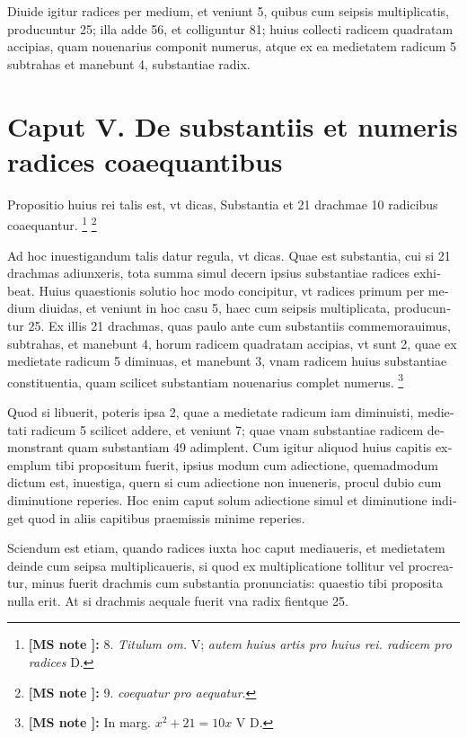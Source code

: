 \documentclass[11pt,a4paper]{book}
\newcounter{critnotectr}
\newcommand{\critnote}[1]{\stepcounter{critnotectr}\textsuperscript{\tiny\textcolor{criticalnote}{\thecritnotectr}}\footnote{\tiny\textcolor{criticalnote}{\textbf{[MS note \thecritnotectr]:} #1}}}
\begin{document}
\textlatin{Diuide igitur radices per medium, et veniunt 5, quibus cum seipsis multiplicatis, producuntur 25; illa adde 56, et colliguntur 81; huius collecti radicem quadratam accipias, quam nouenarius componit numerus, atque ex ea medietatem radicum 5 subtrahas et manebunt 4, substantiae radix.}

\vspace{0.5cm}

\section*{Caput V. De substantiis et numeris radices coaequantibus}

\textlatin{Propositio huius rei talis est, vt dicas, Substantia et 21 drachmae 10 radicibus coaequantur.}
\critnote{8. \textit{Titulum om.} V; \textit{autem huius artis pro huius rei. radicem pro radices} D.}
\critnote{9. \textit{coequatur pro aequatur}.}

\textlatin{Ad hoc inuestigandum talis datur regula, vt dicas. Quae est substantia, cui si 21 drachmas adiunxeris, tota summa simul decern ipsius substantiae radices exhibeat. Huius quaestionis solutio hoc modo concipitur, vt radices primum per medium diuidas, et veniunt in hoc casu 5, haec cum seipsis multiplicata, producuntur 25. Ex illis 21 drachmas, quas paulo ante cum substantiis commemorauimus, subtrahas, et manebunt 4, horum radicem quadratam accipias, vt sunt 2, quae ex medietate radicum 5 diminuas, et manebunt 3, vnam radicem huius substantiae constituentia, quam scilicet substantiam nouenarius complet numerus.}
\critnote{In marg. $x^2 + 21 = 10x$ V D.}

\textlatin{Quod si libuerit, poteris ipsa 2, quae a medietate radicum iam diminuisti, medietati radicum 5 scilicet addere, et veniunt 7; quae vnam substantiae radicem demonstrant quam substantiam 49 adimplent. Cum igitur aliquod huius capitis exemplum tibi propositum fuerit, ipsius modum cum adiectione, quemadmodum dictum est, inuestiga, quern si cum adiectione non inueneris, procul dubio cum diminutione reperies. Hoc enim caput solum adiectione simul et diminutione indiget quod in aliis capitibus praemissis minime reperies.}

\textlatin{Sciendum est etiam, quando radices iuxta hoc caput mediaueris, et medietatem deinde cum seipsa multiplicaueris, si quod ex multiplicatione tollitur vel procreatur, minus fuerit drachmis cum substantia pronunciatis: quaestio tibi proposita nulla erit. At si drachmis aequale fuerit vna radix fientque 25.}
\end{document}
